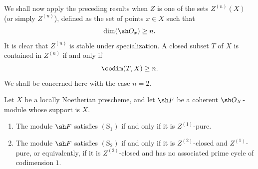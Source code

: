 \begin{env}[5.10.13]
\label{IV.5.10.13}
We shall now apply the preceding results when $Z$ is one of the
sets $Z^{(n)}(X)$ (or simply $Z^{(n)}$), defined as the set of
points $x\in X$ such that
\[
  \dim(\sh O_x)\geq n.
\]
It is clear that $Z^{(n)}$ is stable under specialization.  A
closed subset $T$ of $X$ is contained in $Z^{(n)}$ if and only if
\[
  \codim(T,X)\geq n.
\]
We shall be concerned here with the case $n=2$.
\end{env}

\begin{proposition}[5.10.14]
\label{IV.5.10.14}
Let $X$ be a locally Noetherian prescheme, and let $\sh F$ be a
coherent $\sh O_X$-module whose support is $X$.
\begin{enumerate}[{\rm(i)}]
  \item The module $\sh F$ satisfies $(\mathrm S_1)$ if and only
  if it is $Z^{(1)}$-pure.
  \item The module $\sh F$ satisfies $(\mathrm S_2)$ if and only
  if it is $Z^{(2)}$-closed and $Z^{(1)}$-pure, or equivalently,
  if it is $Z^{(2)}$-closed and has no associated prime cycle of
  codimension $1$.
\end{enumerate}
\end{proposition}


